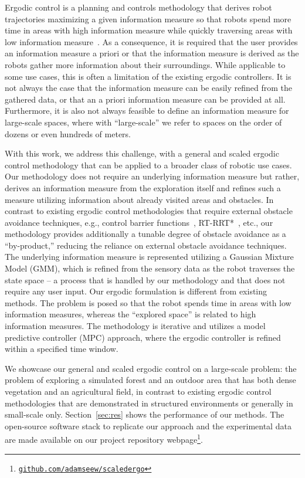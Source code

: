 \documentclass[letterpaper,10pt,conference,twoside]{IEEEtran}
\theoremstyle{definition}
\begin{document}
Ergodic control is a planning and controls methodology that derives robot trajectories maximizing a given information measure so that robots spend more time in areas with high information measure while quickly traversing areas with low information measure~\cite{mathew2011metrics,abraham2017ergodic,miller2013trajectory}. As a consequence, it is required that the user provides an information measure a priori or that the information measure is derived as the robots gather more information about their surroundings. While applicable to some use cases, this is often a limitation of the existing ergodic controllers. It is not always the case that the information measure can be easily refined from the gathered data, or that an a priori information measure can be provided at all. Furthermore, it is also not always feasible to define an information measure for large-scale spaces, %
where with ``large-scale'' we refer to spaces on the order of dozens or even hundreds of meters. 

With this work, we address this challenge, with a general and scaled ergodic control methodology that can be applied to a broader class of robotic use cases. Our methodology does not require an underlying information measure but rather, derives an information measure from the exploration itself and refines such a measure utilizing information about already visited areas and obstacles. %
In contrast to existing ergodic control methodologies that require external obstacle avoidance techniques, e.g., control barrier functions~\cite{lerch2023safety}, RT-RRT*~\cite{prabhakar2020ergodic}, etc., our methodology provides additionally a tunable degree of obstacle avoidance as a ``by-product,'' reducing the reliance on external obstacle avoidance techniques.  
%
The underlying information measure is represented utilizing a Gaussian Mixture Model (GMM), which is refined from the sensory data as the robot traverses the state space -- a process that is handled by our methodology and that does not require any user input. Our ergodic formulation is different from existing methods. The problem is posed so that the robot spends time in areas with low information measures, whereas the ``explored space'' is related to high information measures. The methodology is iterative and utilizes a model predictive controller (MPC) approach, where the ergodic controller is refined within a specified time window.

\IEEEpubidadjcol
We showcase our general and scaled ergodic control on a large-scale problem: the problem of exploring a simulated forest and an outdoor area that has both dense vegetation and an agricultural field, in contrast to existing ergodic control methodologies that are demonstrated in structured environments or generally in small-scale only. Section~\ref{sec:res} shows the performance of our methods. The open-source software stack to replicate our approach and the experimental data are made available on our project repository webpage\footnote{\href{https://github.com/adamseew/scaledergo}{\tt github.com/adamseew/scaledergo}}.
\end{document}

